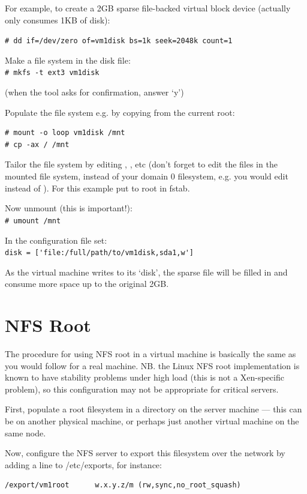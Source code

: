 \documentclass[11pt,twoside,final,openright]{xenstyle}
\begin{document}
For example, to create a 2GB sparse file-backed virtual block device
(actually only consumes 1KB of disk):

\verb_# dd if=/dev/zero of=vm1disk bs=1k seek=2048k count=1_

Make a file system in the disk file: \\
\verb_# mkfs -t ext3 vm1disk_

(when the tool asks for confirmation, answer `y')

Populate the file system e.g. by copying from the current root:
\begin{verbatim}
# mount -o loop vm1disk /mnt
# cp -ax / /mnt
\end{verbatim}
Tailor the file system by editing ,
, etc (don't forget to edit the files in the
mounted file system, instead of your domain 0 filesystem, e.g. you
would edit  instead of  ).  For
this example put  to root in fstab.

Now unmount (this is important!):\\
\verb_# umount /mnt_

In the configuration file set:\\
\verb_disk = ['file:/full/path/to/vm1disk,sda1,w']_

As the virtual machine writes to its `disk', the sparse file will be
filled in and consume more space up to the original 2GB.

\section{NFS Root}

The procedure for using NFS root in a virtual machine is basically the
same as you would follow for a real machine.  NB. the Linux NFS root
implementation is known to have stability problems under high load
(this is not a Xen-specific problem), so this configuration may not be
appropriate for critical servers.

First, populate a root filesystem in a directory on the server machine
--- this can be on another physical machine, or perhaps just another
virtual machine on the same node.

Now, configure the NFS server to export this filesystem over the
network by adding a line to /etc/exports, for instance:

\begin{verbatim}
/export/vm1root      w.x.y.z/m (rw,sync,no_root_squash)
\end{verbatim}
\end{document}
